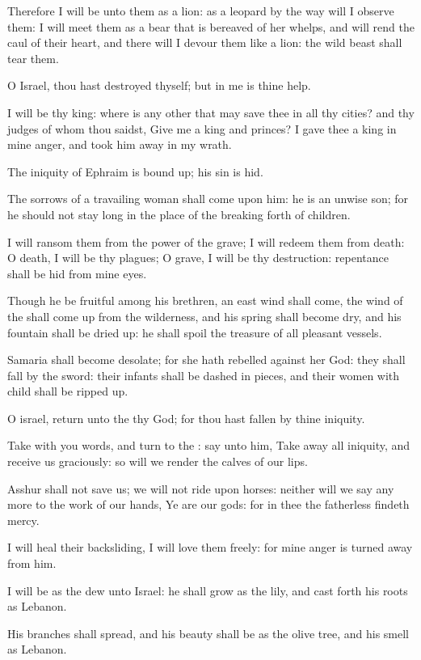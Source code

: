 \Verse Therefore I will be unto them as a lion: as a leopard by the way will I observe them: \Verse I will meet them as a bear that is bereaved of her whelps, and will rend the caul of their heart, and there will I devour them like a lion: the wild beast shall tear them.

\Verse O Israel, thou hast destroyed thyself; but in me is thine help.

\Verse I will be thy king: where is any other that may save thee in all thy cities? and thy judges of whom thou saidst, Give me a king and princes?  \Verse I gave thee a king in mine anger, and took him away in my wrath.

\Verse The iniquity of Ephraim is bound up; his sin is hid.

\Verse The sorrows of a travailing woman shall come upon him: he is an unwise son; for he should not stay long in the place of the breaking forth of children.

\Verse I will ransom them from the power of the grave; I will redeem them from death: O death, I will be thy plagues; O grave, I will be thy destruction: repentance shall be hid from mine eyes.

\Verse Though he be fruitful among his brethren, an east wind shall come, the wind of the \LORD shall come up from the wilderness, and his spring shall become dry, and his fountain shall be dried up: he shall spoil the treasure of all pleasant vessels.

\Verse Samaria shall become desolate; for she hath rebelled against her God: they shall fall by the sword: their infants shall be dashed in pieces, and their women with child shall be ripped up.


\Chapter
\Verse O israel, return unto the \LORD thy God; for thou hast fallen by thine iniquity.

\Verse Take with you words, and turn to the \LORD: say unto him, Take away all iniquity, and receive us graciously: so will we render the calves of our lips.

\Verse Asshur shall not save us; we will not ride upon horses: neither will we say any more to the work of our hands, Ye are our gods: for in thee the fatherless findeth mercy.

\Verse I will heal their backsliding, I will love them freely: for mine anger is turned away from him.

\Verse I will be as the dew unto Israel: he shall grow as the lily, and cast forth his roots as Lebanon.

\Verse His branches shall spread, and his beauty shall be as the olive tree, and his smell as Lebanon.

